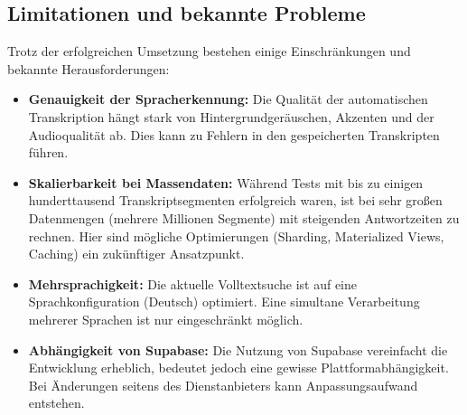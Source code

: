 \subsection{Limitationen und bekannte Probleme}
\label{sec:limitationen}
Trotz der erfolgreichen Umsetzung bestehen einige Einschränkungen und bekannte Herausforderungen:

\begin{itemize}
        \item \textbf{Genauigkeit der Spracherkennung:}
        Die Qualität der automatischen Transkription hängt stark von Hintergrundgeräuschen, Akzenten und der Audioqualität ab. Dies kann zu Fehlern in den gespeicherten Transkripten führen.

        \item \textbf{Skalierbarkeit bei Massendaten:}
        Während Tests mit bis zu einigen hunderttausend Transkriptsegmenten erfolgreich waren,
        ist bei sehr großen Datenmengen (mehrere Millionen Segmente) mit steigenden Antwortzeiten zu rechnen.
        Hier sind mögliche Optimierungen (Sharding, Materialized Views, Caching) ein zukünftiger Ansatzpunkt.

        \item \textbf{Mehrsprachigkeit:}
        Die aktuelle Volltextsuche ist auf eine Sprachkonfiguration (Deutsch) optimiert.
        Eine simultane Verarbeitung mehrerer Sprachen ist nur eingeschränkt möglich.

        \item \textbf{Abhängigkeit von Supabase:}
        Die Nutzung von Supabase vereinfacht die Entwicklung erheblich, bedeutet jedoch eine gewisse Plattformabhängigkeit.
        Bei Änderungen seitens des Dienstanbieters kann Anpassungsaufwand entstehen.
    \end{itemize}

